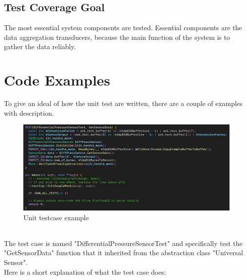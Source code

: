 \subsection{Test Coverage Goal}
The most essential system components are tested. Essential components are the data aggregation transducers, because the main function of the system is to gather the data reliably.
\section{Code Examples}
To give an ideal of how the unit test are written, there are a couple of examples with description.\\
\begin{figure}[h!]
  \includegraphics[scale=0.60]{figures/Code example.png}
  \caption{Unit testcase example}
\end{figure}\\
The test case is named "DifferentialPressureSensorTest" and specifically test the "GetSensorData" function that it inherited from the abstraction class "Universal Sensor".\\
Here is a short explanation of what the test case does:
